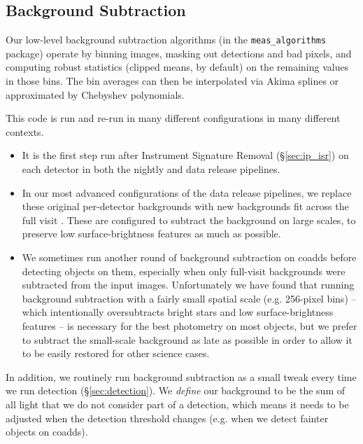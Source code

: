 \subsection{Background Subtraction}
\label{sec:backgrounds}

Our low-level background subtraction algorithms (in the \texttt{meas\_algorithms} package) operate by binning images, masking out detections and bad pixels, and computing robust statistics (clipped means, by default) on the remaining values in those bins.
The bin averages can then be interpolated via Akima splines or approximated by Chebyshev polynomials.

This code is run and re-run in many different configurations in many different contexts.

\begin{itemize}
\item It is the first step run after Instrument Signature Removal (\S\ref{sec:ip_isr}) on each detector in both the nightly and data release pipelines.
\item In our most advanced configurations of the data release pipelines, we replace these original per-detector backgrounds with new backgrounds fit across the full visit \citep{2019PASJ...71..114A}.
These are configured to subtract the background on large scales, to preserve low surface-brightness features as much as possible.
\item We sometimes run another round of background subtraction on coadds before detecting objects on them, especially when only full-visit backgrounds were subtracted from the input images.
Unfortunately we have found that running background subtraction with a fairly small spatial scale (e.g. 256-pixel bins) -- which intentionally oversubtracts bright stars and low surface-brightness features -- is necessary for the best photometry on most objects, but we prefer to subtract the small-scale background as late as possible in order to allow it to be easily restored for other science cases.
\end{itemize}

In addition, we routinely run background subtraction as a small tweak every time we run detection (\S\ref{sec:detection}).
We \emph{define} our background to be the sum of all light that we do not consider part of a detection, which means it needs to be adjusted when the detection threshold changes (e.g. when we detect fainter objects on coadds).
